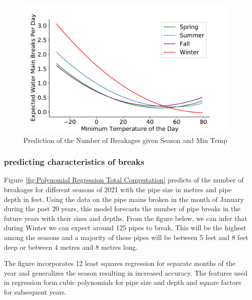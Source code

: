 \documentclass[twocolumn]{article}
\begin{document}
\begin{figure}[h!]
    \centering
    \includegraphics[width = \columnwidth]{Wen/break prediction given temperature and season.pdf}
    \caption{Prediction of the Number of Breakages given Season and Min Temp}
    \label{fig:break prediction by season and temp}
\end{figure}


\subsubsection{ predicting characteristics of breaks}

Figure \ref{fig:Polynomial Regression Total Computation} predicts of the number of breakages for different seasons of 2021 with the pipe size in metres and pipe depth in feet. Using the data on the pipe mains broken in the month of January during the past 20 years, this model forecasts the number of pipe breaks in the future years with their sizes and depths. From the figure below, we can infer that during Winter we can expect around 125 pipes to break. This will be the highest among the seasons and a majority of these pipes will be between 5 feet and 8 feet deep or between 4 metres and 8 metres long.

The figure incorporates 12 least squares regression for separate months of the year and generalizes the season resulting in increased accuracy. The features used in regression form cubic polynomials for pipe size and depth and square factors for subsequent years.   
\end{document}
